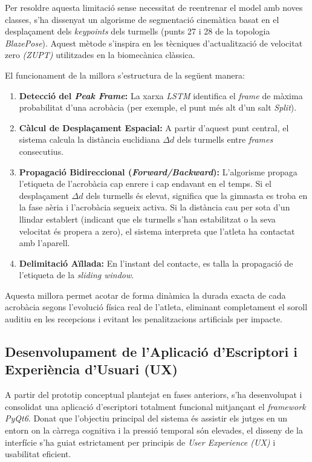 \documentclass[10pt,a4paper,twocolumn,twoside]{article}
\begin{document}
Per resoldre aquesta limitació sense necessitat de reentrenar el model amb noves classes, s'ha dissenyat un algorisme de segmentació cinemàtica basat en el desplaçament dels \textit{keypoints} dels turmells (punts 27 i 28 de la topologia \textit{BlazePose}). Aquest mètode s'inspira en les tècniques d'actualització de velocitat zero \textit{(ZUPT)} utilitzades en la biomecànica clàssica.

El funcionament de la millora s'estructura de la següent manera:
\begin{enumerate}
    \item \textbf{Detecció del \textit{Peak Frame}:} La xarxa \textit{LSTM} identifica el \textit{frame} de màxima probabilitat d'una acrobàcia (per exemple, el punt més alt d'un salt \textit{Split}).
    \item \textbf{Càlcul de Desplaçament Espacial:} A partir d'aquest punt central, el sistema calcula la distància euclidiana $\Delta d$ dels turmells entre \textit{frames} consecutius.
    \item \textbf{Propagació Bidireccional (\textit{Forward/Backward}):} L'algorisme propaga l'etiqueta de l'acrobàcia cap enrere i cap endavant en el temps. Si el desplaçament $\Delta d$ dels turmells és elevat, significa que la gimnasta es troba en la fase aèria i l'acrobàcia segueix activa. Si la distància cau per sota d'un llindar establert (indicant que els turmells s'han estabilitzat o la seva velocitat és propera a zero), el sistema interpreta que l'atleta ha contactat amb l'aparell.
    \item \textbf{Delimitació Aïllada:} En l'instant del contacte, es talla la propagació de l'etiqueta de la \textit{sliding window}.
\end{enumerate}

Aquesta millora permet acotar de forma dinàmica la durada exacta de cada acrobàcia segons l'evolució física real de l'atleta, eliminant completament el soroll auditiu en les recepcions i evitant les penalitzacions artificials per impacte.

\subsection{Desenvolupament de l'Aplicació d'Escriptori i Experiència d'Usuari (UX)}
A partir del prototip conceptual plantejat en fases anteriors, s'ha desenvolupat i consolidat una aplicació d'escriptori totalment funcional mitjançant el \textit{framework PyQt6}. Donat que l'objectiu principal del sistema és assistir els jutges en un entorn on la càrrega cognitiva i la pressió temporal són elevades, el disseny de la interfície s'ha guiat estrictament per principis de \textit{User Experience (UX)} i usabilitat eficient.
\end{document}
